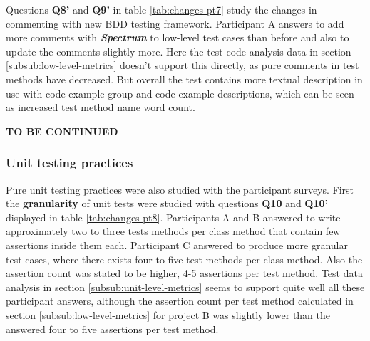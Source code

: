 Questions \textbf{Q8'} and \textbf{Q9'} in table \ref{tab:changes-pt7} study the changes in commenting with new BDD testing framework.
Participant A answers to add more comments with \textbf{\textit{Spectrum}} to low-level test cases
than before and also to update the comments slightly more.
Here the test code analysis data in section \ref{subsub:low-level-metrics} doesn't support this directly, as pure comments
in test methods have decreased. But overall
the test contains more textual description in use with code example group and code example descriptions, which can be seen
as increased test method name word count.

\textbf{TO BE CONTINUED}
\clearpage
\subsubsection{Unit testing practices}
Pure unit testing practices were also studied with the participant surveys. First the \textbf{granularity} of unit tests were
studied with questions \textbf{Q10} and \textbf{Q10'} displayed in table \ref{tab:changes-pt8}. Participants A and B answered
to write approximately two to three tests methods per class method that contain few assertions inside them each. Participant
C answered to produce more granular test cases, where there exists four to five test methods per class method.
Also the assertion count was stated to be higher, 4-5 assertions per test method. Test data analysis in section \ref{subsub:unit-level-metrics}
seems to support quite well all these participant answers, although the assertion count per test method calculated in section \ref{subsub:low-level-metrics}
for project B was slightly lower than the answered four to five assertions per test method.

